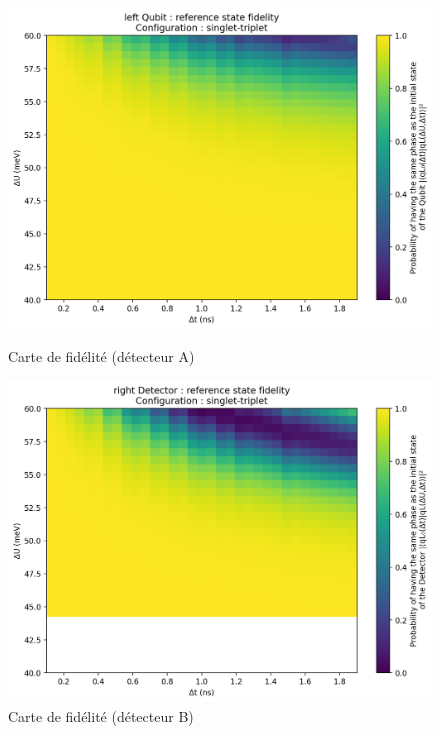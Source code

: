 \documentclass{article}
\begin{document}
\begin{figure}[H]
  \centering
  \begin{minipage}[c]{0.48\textwidth}
    \centering
    \includegraphics[width=\textwidth]{p_qubit_overlap_map_left_33x33_20250822-064424.png}
    \caption{Carte de fidélité (détecteur A)}
    \label{fig:fidelity_map_a}
  \end{minipage}\hfill
  \begin{minipage}[c]{0.48\textwidth}
    \centering
    \includegraphics[width=\textwidth]{p_detector_overlap_map_33x33_bon_singlet-triplet.png}
    \caption{Carte de fidélité (détecteur B)}
    \label{fig:fidelity_map_b}
  \end{minipage}
\end{figure}
\end{document}
